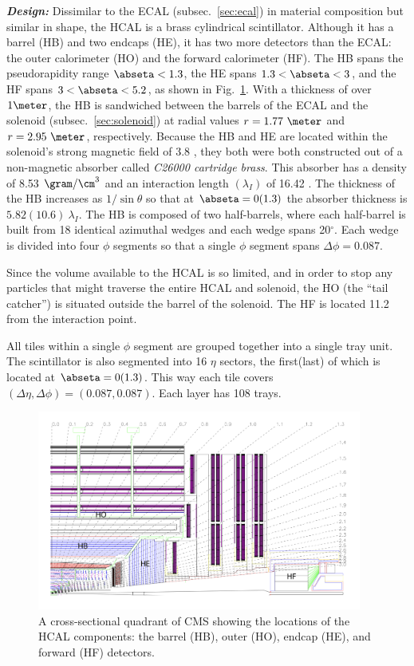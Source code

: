 \textit{\textbf{Design:}}
Dissimilar to the ECAL (subsec.~\ref{sec:ecal}) in material composition but similar in shape, the HCAL is a brass cylindrical scintillator.
Although it has a barrel (HB) and two endcaps (HE), it has two more detectors than the ECAL: the outer calorimeter (HO) and the forward calorimeter (HF).
The HB spans the pseudorapidity range $\abseta < 1.3$, the HE spans $1.3 < \abseta < 3$, and the HF spans $3 < \abseta < 5.2$, as shown in Fig.~\ref{fig:hcal_quadrant}.
With a thickness of over $1\meter$, the HB is sandwiched between the barrels of the ECAL and the solenoid (subsec.~\ref{sec:solenoid}) at radial values $r = 1.77~\meter$ and $r = 2.95~\meter$, respectively.
Because the HB and HE are located within the solenoid's strong magnetic field of 3.8 \tesla, they both were both constructed out of a non-magnetic absorber called \emph{C26000 cartridge brass}.
This absorber has a density of 8.53 $\gram/\cm^{3}$ and an interaction length $(\lambda_I)$ of 16.42 \cm.
The thickness of the HB increases as $1/\sin{\theta}$ so that at $\abseta = 0(1.3)$ the absorber thickness is $5.82(10.6)~\lambda_I$.
The HB is composed of two half-barrels, where each half-barrel is built from 18 identical azimuthal wedges and each wedge spans 20$^\circ$.
Each wedge is divided into four $\phi$ segments so that a single $\phi$ segment spans $\Delta \phi = 0.087$.

Since the volume available to the HCAL is so limited, and in order to stop any particles that might traverse the entire HCAL and solenoid, the HO (the ``tail catcher'') is situated outside the barrel of the solenoid.
The HF is located 11.2 \meter from the interaction point.

All tiles within a single $\phi$ segment are grouped together into a single tray unit.
The scintillator is also segmented into 16 $\eta$ sectors, the first(last) of which is located at $\abseta = 0(1.3)$.
This way each tile covers $(\Delta \eta, \Delta \phi) = (0.087, 0.087)$.
Each layer has 108 trays.

\begin{figure}[pbth]
    \centering
    \includegraphics[width=0.95\textwidth]{figures/cms/hcal/hcal_quadrants_longitudinalview.jpg}
    \caption{
        A cross-sectional quadrant of CMS showing the locations of the HCAL components:
        the barrel (HB), outer (HO), endcap (HE), and forward (HF) detectors.
        }
    \label{fig:hcal_quadrant}
\end{figure}

